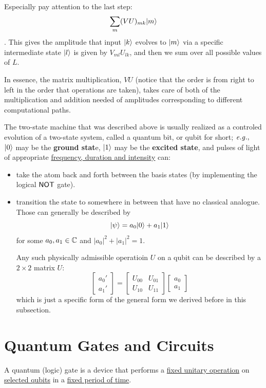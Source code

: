 \documentclass[12pt]{article}
\begin{document}
\begin{intuition}
Especially pay attention to the last step: $$
\underset{m}{\sum}(VU)_{mk}\Ket{m}
$$. This gives the amplitude that input $\Ket{k}$ evolves to $\Ket{m}$ via a specific intermediate state $\Ket{l}$ is given by $V_{ml}U_{lk}$, and then we sum over all possible values of $L$.

In essence, the matrix multiplication, $VU$ (notice that the order is from right to left in the order that operations are taken), takes care of both of the multiplication and addition needed of amplitudes corresponding to different computational paths.
\end{intuition}

\begin{definition}[Qubit]
The two-state machine that was described above is usually realized as a controled evolution of a two-state system, called a quantum bit, or qubit for short; $\eg$ $\Ket{0}$ may be the \textbf{ground stat}e, $\Ket{1}$ may be the \textbf{excited state}, and pulses of light of appropriate \underline{frequency, duration and intensity} can:
\begin{itemize}
    \item take the atom back and forth between the basis states (by implementing the logical $\NOT$ gate).
    \item transition the state to somewhere in between that have no classical analogue. Those can generally be described by $$
    \Ket{\psi} = a_0\Ket{0} + a_1\Ket{1}
    $$ for some $a_0, a_1\in \CC$ and $|a_0|^2 + |a_1|^2 = 1$.
    
    Any such physically admissible operatioin $U$ on a qubit can be described by a $2\times 2$ matrix $U$: $$
    \begin{bmatrix}
    a_0'\\
    a_1'
    \end{bmatrix} = \begin{bmatrix}
    U_{00} & U_{01}\\
    U_{10} & U_{11}
    \end{bmatrix}\begin{bmatrix}
    a_0\\
    a_1
    \end{bmatrix}
    $$ which is just a specific form of the general form we derived before in this subsection.
\end{itemize}
\end{definition}

\section{Quantum Gates and Circuits}
\begin{definition}
A quantum (logic) gate is a device that performs a \underline{fixed unitary operation} on \underline{selected qubits} in a \underline{fixed period of time}.
\end{definition}
\end{document}
